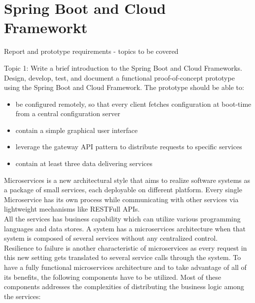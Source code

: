\chapter{Spring Boot and Cloud Frameworkt}\label{ch:spring}
Report and prototype requirements - topics to be covered

Topic 1: Write a brief introduction to the Spring Boot and Cloud Frameworks. Design, develop, test, and document a functional proof-of-concept prototype using the Spring Boot and Cloud Framework. The prototype should be able to:
\begin{itemize}
\item be configured remotely, so that every client fetches configuration at boot-time from a central configuration server
\item contain a simple graphical user interface
\item leverage the gateway API pattern to distribute requests to specific services
\item contain at least three data delivering services 
\end{itemize}
Microservices is a new architectural style that aims to realize software systems as a package of small services, each deployable on different platform. Every single Microservice has its own process while communicating with other services via lightweight mechanisms like RESTFull APIs.\\

All the services has business capability which can utilize various programming languages and data stores. A system has a microservices architecture when that system is composed of several services without any centralized control.\\

Resilience to failure is another characteristic of microservices as every request in this new setting gets translated to several service calls through the system. To have a fully functional microservices architecture and to take advantage of all of its benefits, the following components have to be utilized. Most of these components addresses the complexities of distributing the business logic among the services:

